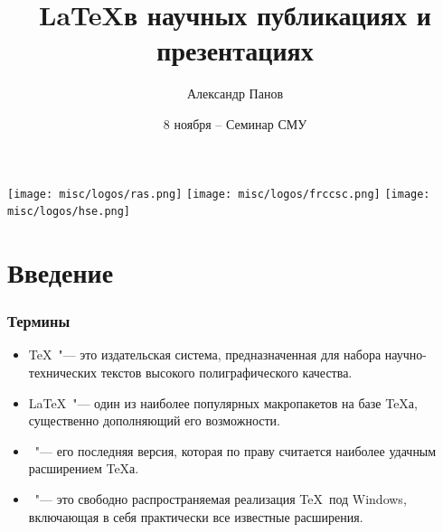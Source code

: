 \documentclass[default]{beamer}
\begin{document}
	
	\title[\LaTeX]{\LaTeX в научных публикациях и презентациях}
	\author[Панов]{Александр Панов}
	\date{8 ноября -- Семинар СМУ} 
	
	\begin{frame}
		\titlepage
		\centering
		\texttt{[image: misc/logos/ras.png]} \hspace{10pt}
		\texttt{[image: misc/logos/frccsc.png]} \hspace{10pt}
		\texttt{[image: misc/logos/hse.png]}
	\end{frame}
	
	\begin{frame}
		\small
		\tableofcontents
	\end{frame}
	
	\section{Введение}
	\begin{frame}
		\frametitle{Термины}
		\begin{itemize}
			\item \TeX\ "--- это издательская система, предназначенная для набора научно-технических
			текстов высокого полиграфического качества. 
			\item \LaTeX\ "--- один из наиболее популярных макропакетов на базе \TeX а, существенно дополняющий его возможности. 
			\item \LaTeXe\ "---  его последняя версия, которая по праву считается наиболее удачным расширением \TeX а. 
			\item \MiKTeX\ "--- это свободно распространяемая реализация \TeX\ под Windows, включающая в себя практически все известные расширения.
		\end{itemize}
		\nocite{*}
		\printbibliography[resetnumbers=true]
	\end{frame}
\end{document}
